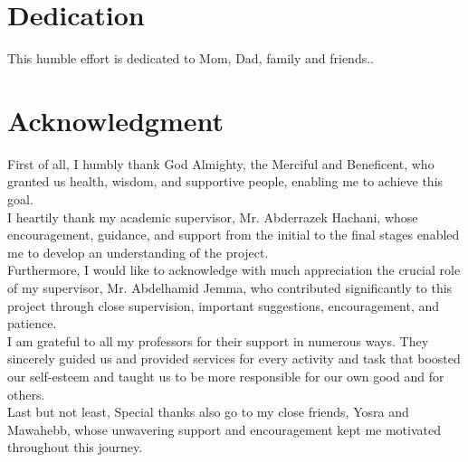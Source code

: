 \chapter*{Dedication}
\vspace*{2cm}
\begin{center}
This humble effort is dedicated to \bigbreak  Mom, Dad, family and friends..
\end{center}
\chapter*{Acknowledgment}

First of all, I humbly thank God Almighty, the Merciful and Beneficent, who granted us health, wisdom, and supportive people, enabling me to achieve this goal.
\\

I heartily thank my academic supervisor, Mr. Abderrazek Hachani, whose encouragement, guidance, and support from the initial to the final stages enabled me to develop an understanding of the project.
\\

Furthermore, I would like to acknowledge with much appreciation the crucial role of my supervisor, Mr. Abdelhamid Jemma, who contributed significantly to this project through close supervision, important suggestions, encouragement, and patience.
\\

I am grateful to all my professors for their support in numerous ways. They sincerely guided us and provided services for every activity and task that boosted our self-esteem and taught us to be more responsible for our own good and for others.
\\

Last but not least, Special thanks also go to my close friends, Yosra and Mawahebb, whose unwavering support and encouragement kept me motivated throughout this journey.
